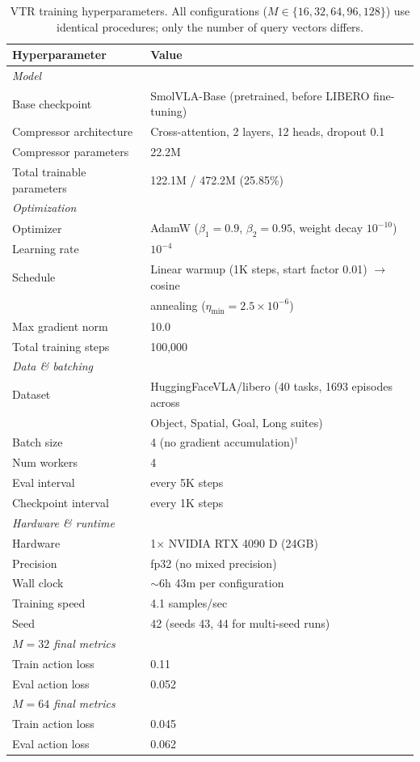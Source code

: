 \begin{table}[ht]
\centering
\small
\caption{VTR training hyperparameters. All configurations ($M \in \{16, 32, 64, 96, 128\}$) use identical procedures; only the number of query vectors differs.}
\label{tab:training_hyperparams}
\begin{tabular}{ll}
\toprule
Hyperparameter & Value \\
\midrule
\multicolumn{2}{l}{\textit{Model}} \\
\quad Base checkpoint & SmolVLA-Base (pretrained, before LIBERO fine-tuning) \\
\quad Compressor architecture & Cross-attention, 2 layers, 12 heads, dropout 0.1 \\
\quad Compressor parameters & 22.2M \\
\quad Total trainable parameters & 122.1M / 472.2M (25.85\%) \\
\midrule
\multicolumn{2}{l}{\textit{Optimization}} \\
\quad Optimizer & AdamW ($\beta_1{=}0.9$, $\beta_2{=}0.95$, weight decay $10^{-10}$) \\
\quad Learning rate & $10^{-4}$ \\
\quad Schedule & Linear warmup (1K steps, start factor 0.01) $\to$ cosine \\
\quad & annealing ($\eta_{\min}{=}2.5 \times 10^{-6}$) \\
\quad Max gradient norm & 10.0 \\
\quad Total training steps & 100,000 \\
\midrule
\multicolumn{2}{l}{\textit{Data \& batching}} \\
\quad Dataset & HuggingFaceVLA/libero (40 tasks, 1693 episodes across \\
\quad & Object, Spatial, Goal, Long suites) \\
\quad Batch size & 4 (no gradient accumulation)$^\dagger$ \\
\quad Num workers & 4 \\
\quad Eval interval & every 5K steps \\
\quad Checkpoint interval & every 1K steps \\
\midrule
\multicolumn{2}{l}{\textit{Hardware \& runtime}} \\
\quad Hardware & 1$\times$ NVIDIA RTX 4090 D (24GB) \\
\quad Precision & fp32 (no mixed precision) \\
\quad Wall clock & $\sim$6h 43m per configuration \\
\quad Training speed & 4.1 samples/sec \\
\quad Seed & 42 (seeds 43, 44 for multi-seed runs) \\
\midrule
\multicolumn{2}{l}{\textit{$M=32$ final metrics}} \\
\quad Train action loss & 0.11 \\
\quad Eval action loss & 0.052 \\
\midrule
\multicolumn{2}{l}{\textit{$M=64$ final metrics}} \\
\quad Train action loss & 0.045 \\
\quad Eval action loss & 0.062 \\
\bottomrule
\end{tabular}


\end{table}
